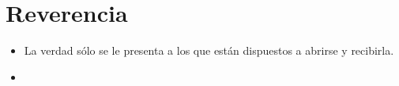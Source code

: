 \section{Reverencia}
\begin{itemize}
    \item La verdad sólo se le presenta a los que están dispuestos a abrirse y recibirla.
    \item 
\end{itemize}
